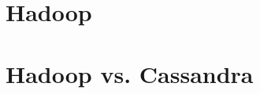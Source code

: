 \documentclass[11pt,twoside,a4paper]{book}
\begin{document}

\section{Hadoop}


\section{Hadoop vs. Cassandra}

% 



% 
% 
\end{document}
